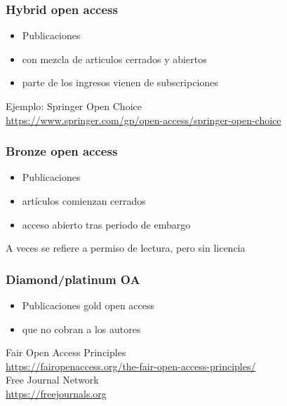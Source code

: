 \documentclass[17pt,aspectratio=169]{beamer}
\begin{document}
\begin{frame}
\frametitle{Hybrid open access}

\begin{itemize}
\item Publicaciones
\item con mezcla de articulos cerrados y abiertos
\item parte de los ingresos vienen de subscripciones
\end{itemize}

\begin{flushright}
  Ejemplo: Springer Open Choice \\
  {\small \url{https://www.springer.com/gp/open-access/springer-open-choice}} \\
\end{flushright}
\end{frame}

\begin{frame}
\frametitle{Bronze open access}

\begin{itemize}
\item Publicaciones
\item artículos comienzan cerrados
\item acceso abierto tras periodo de embargo
\end{itemize}

A veces se refiere a permiso de lectura, pero sin licencia

\end{frame}

\begin{frame}
\frametitle{Diamond/platinum OA}

\begin{itemize}
\item Publicaciones gold open access
\item que no cobran a los autores
\end{itemize}

\begin{flushright}
  Fair Open Access Principles \\
  {\small \url{https://fairopenaccess.org/the-fair-open-access-principles/}} \\
  Free Journal Network \\
  {\small \url{https://freejournals.org}} \\
\end{flushright}
\end{frame}
\end{document}
